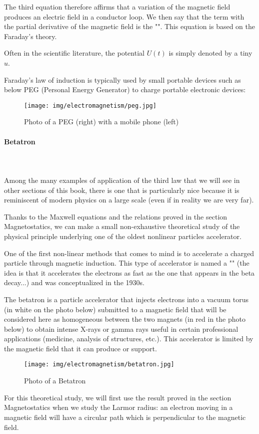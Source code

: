 	The third equation therefore affirms that a variation of the magnetic field produces an electric field in a conductor loop. We then say that the term with the partial derivative of the magnetic field is the "". This equation is based on the Faraday's theory.
	\begin{tcolorbox}[title=Remark,colframe=black,arc=10pt]
	Often in the scientific literature, the potential $U (t)$ is simply denoted by a tiny $u$.
	\end{tcolorbox}
	Faraday's law of induction is typically used by small portable devices such as below PEG (Personal Energy Generator) to charge portable electronic devices:
	\begin{figure}[H]
		\centering
		\texttt{[image: img/electromagnetism/peg.jpg]}
		\caption{Photo of a PEG (right) with a mobile phone (left)}
	\end{figure}

	\paragraph{Betatron}\mbox{}\\\\
	Among the many examples of application of the third law that we will see in other sections of this book, there is one that is particularly nice because it is reminiscent of modern physics on a large scale (even if in reality we are very far).
	
	Thanks to the Maxwell equations and the relations proved in the section Magnetostatics, we can make a small non-exhaustive theoretical study of the physical principle underlying one of the oldest nonlinear particles accelerator.
	
	One of the first non-linear methods that comes to mind is to accelerate a charged particle through magnetic induction. This type of accelerator is named a "" (the idea is that it accelerates the electrons as fast as the one that appears in the beta decay...) and was conceptualized in the 1930s.	
	
	The betatron is a particle accelerator that injects electrons into a vacuum torus (in white on the photo below) submitted to a magnetic field that will be considered here as homogeneous between the two magnets (in red in the photo below) to obtain intense X-rays or gamma rays useful in certain professional applications (medicine, analysis of structures, etc.). This accelerator is limited by the magnetic field that it can produce or support.
	\begin{figure}[H]
		\centering
		\texttt{[image: img/electromagnetism/betatron.jpg]}
		\caption{Photo of a Betatron}
	\end{figure}
	For this theoretical study, we will first use the result proved in the section Magnetostatics when we study the Larmor radius: an electron moving in a magnetic field will have a circular path which is perpendicular to the magnetic field.
	
